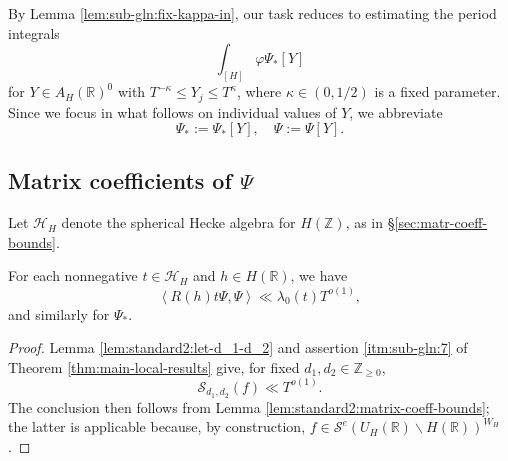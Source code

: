 By Lemma \ref{lem:sub-gln:fix-kappa-in}, our task reduces to estimating the period integrals
\begin{equation*}
  \int_{[H]} \varphi \Psi_{\ast}[Y]
\end{equation*}
for $Y \in A_H(\mathbb{R})^0$ with $T^{-\kappa} \leq Y_j \leq T^\kappa$, where $\kappa \in (0,1/2)$ is a fixed parameter.  Since we focus in what follows on individual values of $Y$, we abbreviate 
\begin{equation*}
  \Psi_{\ast} := \Psi_{\ast}[Y],
  \quad
  \Psi := \Psi[Y].
\end{equation*}


\subsection{Matrix coefficients of $\Psi$}\label{sec:matr-coeff-our}
Let $\mathcal{H}_H$ denote the spherical Hecke algebra for $H(\mathbb{Z})$, as in \S\ref{sec:matr-coeff-bounds}.
\begin{lemma}\label{lem:sub-gln:each-y-in}
  For each nonnegative $t \in \mathcal{H}_H$ and $h \in H(\mathbb{R})$, we have
  \begin{equation}
    \left\langle R(h) t \Psi, \Psi  \right\rangle \ll \lambda_0(t) T^{o(1)},
  \end{equation}
  and similarly for $\Psi_{\ast}$.
\end{lemma}
\begin{proof}
  Lemma \ref{lem:standard2:let-d_1-d_2} and assertion \eqref{itm:sub-gln:7} of Theorem \ref{thm:main-local-results} give, for fixed $d_1, d_2 \in \mathbb{Z}_{\geq 0}$,
  \begin{equation*}
    \mathcal{S}_{d_1,d_2}(f) \ll T^{o(1)}.
  \end{equation*}
  The conclusion then follows from Lemma \ref{lem:standard2:matrix-coeff-bounds}; the latter is applicable because, by construction, $f \in \mathcal{S}^e(U_H(\mathbb{R}) \backslash H(\mathbb{R}))^{W_H}$.
\end{proof}

